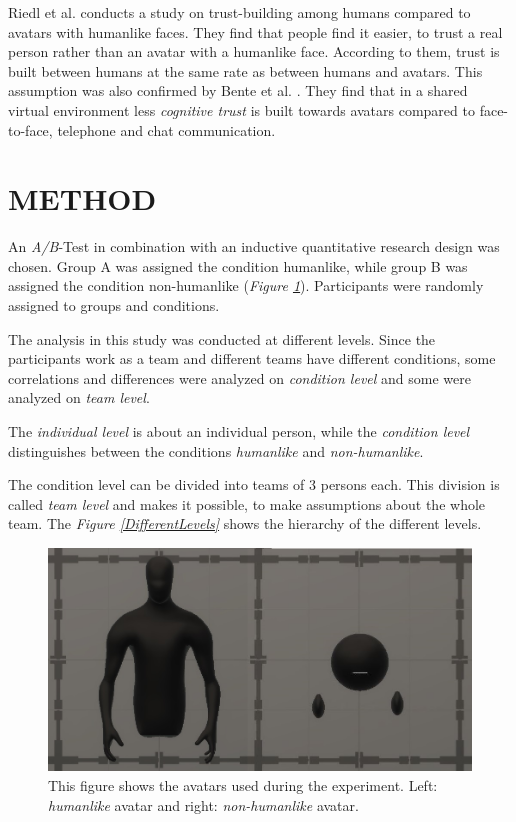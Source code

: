 \documentclass[sigchi]{acmart}
\begin{document}
Riedl et al. \citep{riedl2014trusting} conducts a study on trust-building among humans compared to avatars with humanlike faces. They find that people find it easier, to trust a real person rather than an avatar with a humanlike face. According to them, trust is built between humans at the same rate as between humans and avatars.
This assumption was also confirmed by Bente et al. \citep{bente2004social}. They find that in a shared virtual environment less \textit{cognitive trust} is built towards avatars compared to face-to-face, telephone and chat communication.

\section{METHOD}
An \textit{A/B}-Test in combination with an inductive quantitative research design was chosen.
Group A was assigned the condition humanlike, while group B was assigned the condition non-humanlike (\textit{Figure \ref{Avatars}}). Participants were randomly assigned to groups and conditions. 

The analysis in this study was conducted at different levels.
Since the participants work as a team and different teams have different conditions, some correlations and differences were analyzed on \textit{condition level} and some were analyzed on \textit{team level}.

The \textit{individual level} is about an individual person, while the \textit{condition level} distinguishes between the conditions \textit{humanlike} and \textit{non-humanlike}.

The condition level can be divided into teams of 3 persons each. This division is called \textit{team level} and makes it possible, to make assumptions about the whole team. 
The \textit{Figure \ref{DifferentLevels}} shows the hierarchy of the different levels.

\begin{figure}[h]
  \centering
 		\includegraphics[width=1\linewidth]{Abbildungen/Avatars.JPG}
			\caption[The avatars]{This figure shows the avatars used during the experiment. Left: \textit{humanlike} avatar and right: \textit{non-humanlike} avatar.}
			\label{Avatars}
\end{figure}	
\end{document}
